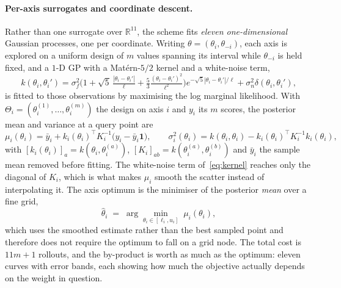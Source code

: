 \documentclass[11pt,a4paper]{article}
\newcommand{\R}{\mathbb{R}}
\begin{document}
\paragraph{Per-axis surrogates and coordinate descent.} Rather than one surrogate over $\R^{11}$, the scheme
fits \emph{eleven one-dimensional} Gaussian processes, one per coordinate. Writing
$\theta=(\theta_i,\theta_{-i})$, each axis is explored on a uniform design of $m$ values spanning its
interval while $\theta_{-i}$ is held fixed, and a $1$-D GP with a Mat\'ern-$5/2$ kernel and a white-noise
term,
\begin{equation}
  k(\theta_i,\theta_i')=\sigma_f^2\Big(1+\sqrt5\,\tfrac{|\theta_i-\theta_i'|}{\ell}
  +\tfrac53\tfrac{(\theta_i-\theta_i')^2}{\ell^2}\Big)e^{-\sqrt5|\theta_i-\theta_i'|/\ell}
  +\sigma_n^2\delta(\theta_i,\theta_i'),
  \label{eq:kernel}
\end{equation}
is fitted to those observations by maximising the log marginal likelihood. With
$\Theta_i=(\theta_i^{(1)},\dots,\theta_i^{(m)})$ the design on axis $i$ and $y_i$ its $m$ scores, the
posterior mean and variance at a query point are
\begin{equation}
  \mu_i(\theta_i)=\bar y_i+k_i(\theta_i)^{\!\top}K_i^{-1}\big(y_i-\bar y_i\mathbf{1}\big),
  \qquad
  \sigma_i^2(\theta_i)=k(\theta_i,\theta_i)-k_i(\theta_i)^{\!\top}K_i^{-1}k_i(\theta_i),
  \label{eq:gppost}
\end{equation}
with $[k_i(\theta_i)]_a=k(\theta_i,\theta_i^{(a)})$, $[K_i]_{ab}=k(\theta_i^{(a)},\theta_i^{(b)})$ and
$\bar y_i$ the sample mean removed before fitting. The white-noise term of~\eqref{eq:kernel} reaches only
the diagonal of $K_i$, which is what makes $\mu_i$ smooth the scatter instead of interpolating it. The axis
optimum is the minimiser of the posterior \emph{mean} over a fine grid,
\begin{equation}
  \hat\theta_i \;=\; \arg\min_{\theta_i\in[\ell_i,u_i]}\; \mu_i(\theta_i),
  \label{eq:axisopt}
\end{equation}
which uses the smoothed estimate rather than the best sampled point and therefore does not require the
optimum to fall on a grid node. The total cost is $11m+1$ rollouts, and the by-product is worth as much as
the optimum: eleven curves with error bands, each showing how much the objective actually depends on the
weight in question.
\end{document}

